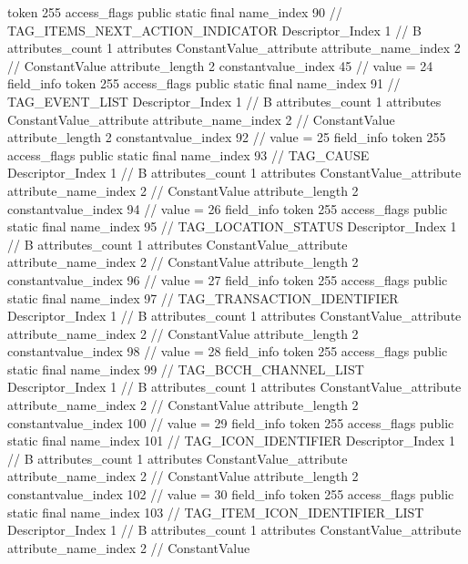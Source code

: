 {{{{{				token	255
				access_flags	public static final
				name_index	90		// TAG_ITEMS_NEXT_ACTION_INDICATOR
				Descriptor_Index	1		// B
				attributes_count	1
				attributes {
				ConstantValue_attribute {
					attribute_name_index	2		// ConstantValue
					attribute_length	2
					constantvalue_index	45		// value = 24
				}
				}
			}
			field_info {
				token	255
				access_flags	public static final
				name_index	91		// TAG_EVENT_LIST
				Descriptor_Index	1		// B
				attributes_count	1
				attributes {
				ConstantValue_attribute {
					attribute_name_index	2		// ConstantValue
					attribute_length	2
					constantvalue_index	92		// value = 25
				}
				}
			}
			field_info {
				token	255
				access_flags	public static final
				name_index	93		// TAG_CAUSE
				Descriptor_Index	1		// B
				attributes_count	1
				attributes {
				ConstantValue_attribute {
					attribute_name_index	2		// ConstantValue
					attribute_length	2
					constantvalue_index	94		// value = 26
				}
				}
			}
			field_info {
				token	255
				access_flags	public static final
				name_index	95		// TAG_LOCATION_STATUS
				Descriptor_Index	1		// B
				attributes_count	1
				attributes {
				ConstantValue_attribute {
					attribute_name_index	2		// ConstantValue
					attribute_length	2
					constantvalue_index	96		// value = 27
				}
				}
			}
			field_info {
				token	255
				access_flags	public static final
				name_index	97		// TAG_TRANSACTION_IDENTIFIER
				Descriptor_Index	1		// B
				attributes_count	1
				attributes {
				ConstantValue_attribute {
					attribute_name_index	2		// ConstantValue
					attribute_length	2
					constantvalue_index	98		// value = 28
				}
				}
			}
			field_info {
				token	255
				access_flags	public static final
				name_index	99		// TAG_BCCH_CHANNEL_LIST
				Descriptor_Index	1		// B
				attributes_count	1
				attributes {
				ConstantValue_attribute {
					attribute_name_index	2		// ConstantValue
					attribute_length	2
					constantvalue_index	100		// value = 29
				}
				}
			}
			field_info {
				token	255
				access_flags	public static final
				name_index	101		// TAG_ICON_IDENTIFIER
				Descriptor_Index	1		// B
				attributes_count	1
				attributes {
				ConstantValue_attribute {
					attribute_name_index	2		// ConstantValue
					attribute_length	2
					constantvalue_index	102		// value = 30
				}
				}
			}
			field_info {
				token	255
				access_flags	public static final
				name_index	103		// TAG_ITEM_ICON_IDENTIFIER_LIST
				Descriptor_Index	1		// B
				attributes_count	1
				attributes {
				ConstantValue_attribute {
					attribute_name_index	2		// ConstantValue
}}}}}}}
